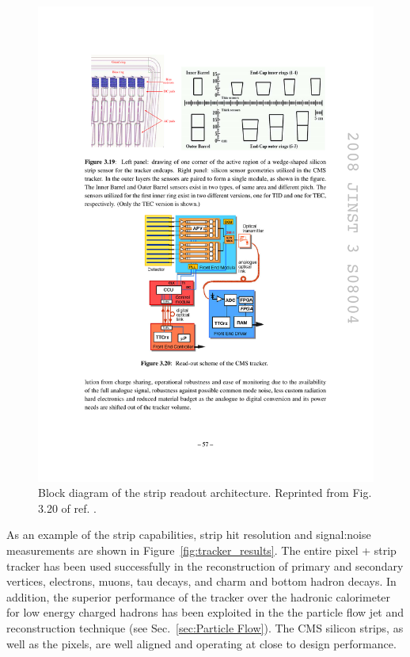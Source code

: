 \documentclass[dissertation.tex]{subfiles}
\begin{document}
\begin{figure}
	\centering
	\includegraphics[scale=1.0]{tracker_readout}
	\caption{Block diagram of the strip readout architecture.  Reprinted from Fig. 3.20 of ref. \cite{CMS_detector_paper}.}
	\label{fig:tracker_readout}
\end{figure}

As an example of the strip capabilities, strip hit resolution and signal:noise measurements are shown in Figure~\ref{fig:tracker_results}.  The entire pixel + strip tracker has been used successfully in the reconstruction of primary and secondary vertices, electrons, muons, tau decays, and charm and bottom hadron decays.  In addition, the superior performance of the tracker over the hadronic calorimeter for low energy charged hadrons has been exploited in the the particle flow jet and \MET reconstruction technique (see Sec.~\ref{sec:Particle Flow}).  The CMS silicon strips, as well as the pixels, are well aligned and operating at close to design performance.  
\end{document}
